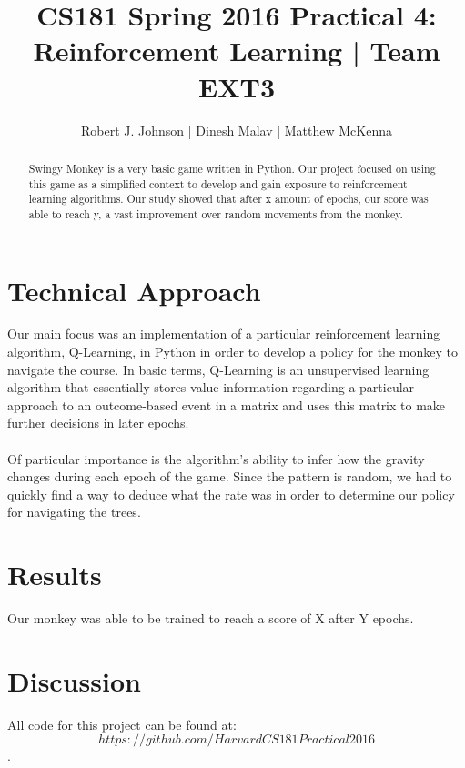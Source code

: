 \documentclass{article}
\begin{document}
\title{CS181 Spring 2016 Practical 4: Reinforcement Learning | Team EXT3}
\author{Robert J. Johnson | Dinesh Malav | Matthew McKenna}


\maketitle

\begin{abstract}
Swingy Monkey is a very basic game written in Python. Our project focused on using this game as a simplified context to develop and gain exposure to reinforcement learning algorithms. Our study showed that after x amount of epochs, our score was able to reach y, a vast improvement over random movements from the monkey.
\end{abstract}
\section{Technical Approach}
Our main focus was an implementation of  a particular reinforcement learning algorithm, Q-Learning, in Python in order to develop a policy for the monkey to navigate the course. In basic terms, Q-Learning is an unsupervised learning algorithm that essentially stores value information regarding a particular approach to an outcome-based event in a matrix and uses this matrix to make further decisions in later epochs.\\\\
Of particular importance is the algorithm's ability to infer how the gravity changes during each epoch of the game. Since the pattern is random, we had to quickly find a way to deduce what the rate was in order to determine our policy for navigating the trees. 
\section{Results}
Our monkey was able to be trained to reach a score of X after Y epochs. 

\section{Discussion}

All code for this project can be found at: $$https://github.com/HarvardCS181Practical2016$$.
\end{document}
